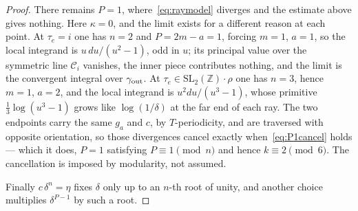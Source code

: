 \documentclass[11pt]{article}
\newcommand{\ZZ}{\mathbb{Z}}
\newcommand{\SLZ}{\mathrm{SL}_2(\ZZ)}
\begin{document}
\begin{proof}
There remains $P=1$, where~\eqref{eq:raymodel} diverges and the estimate above gives nothing. Here
$\kappa=0$, and the limit exists for a different reason at each point. At $\tau_e=i$ one has
$n=2$ and $P=2m-a=1$, forcing $m=1$, $a=1$, so the local integrand is $u\,du/(u^{2}-1)$, odd in
$u$; its principal value over the symmetric line $\mathcal{C}_i$ vanishes, the inner piece
contributes nothing, and the limit is the convergent integral over $\gamma_{\rm out}$. At
$\tau_e\in\SLZ\!\cdot\!\rho$ one has $n=3$, hence $m=1$, $a=2$, and the local integrand is
$u^{2}du/(u^{3}-1)$, whose primitive $\tfrac13\log(u^{3}-1)$ grows like $\log(1/\delta)$ at the far
end of each ray. The two endpoints carry the same $g_a$ and $c$, by $T$-periodicity, and are
traversed with opposite orientation, so those divergences cancel exactly
when~\eqref{eq:P1cancel} holds --- which it does, $P=1$ satisfying $P\equiv1\pmod n$ and hence
$k\equiv2\pmod6$. The cancellation is imposed by modularity, not assumed.

Finally $c\,\delta^{n}=\eta$ fixes $\delta$ only up to an $n$-th root of unity, and another choice
multiplies $\delta^{P-1}$ by such a root.
\end{proof}
\end{document}
